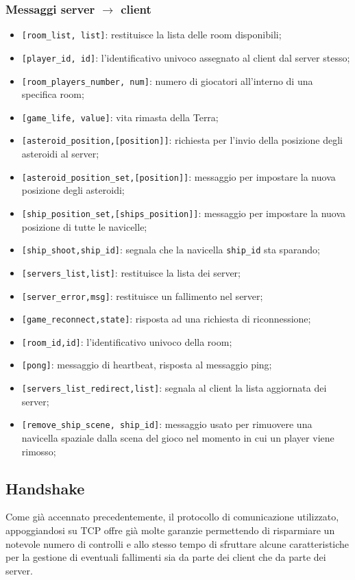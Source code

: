 \documentclass[paper=a4, fontsize=11pt]{scrartcl} %
\numberwithin{equation}{section} %
\numberwithin{figure}{section} %
\numberwithin{table}{section} %
\begin{document}
\subsubsection{Messaggi server $\rightarrow$ client}
\begin{itemize}
\item \texttt{[room\_list, list]}: restituisce la lista delle room disponibili;
\item \texttt{[player\_id, id]}: l'identificativo univoco assegnato al client dal server stesso;
\item \texttt{[room\_players\_number, num]}: numero di giocatori all'interno di una specifica room;
\item \texttt{[game\_life, value]}: vita rimasta della Terra;
\item \texttt{[asteroid\_position,[position]]}: richiesta per l'invio della posizione degli asteroidi al server;
\item \texttt{[asteroid\_position\_set,[position]]}: messaggio per impostare la nuova posizione degli asteroidi;
\item \texttt{[ship\_position\_set,[ships\_position]]}: messaggio per impostare la nuova posizione di tutte le navicelle;
\item \texttt{[ship\_shoot,ship\_id]}: segnala che la navicella \texttt{ship\_id} sta sparando;
\item \texttt{[servers\_list,list]}: restituisce la lista dei server;
\item \texttt{[server\_error,msg]}: restituisce un fallimento nel server;
\item \texttt{[game\_reconnect,state]}: risposta ad una richiesta di riconnessione;
\item \texttt{[room\_id,id]}: l'identificativo univoco della room;
\item \texttt{[pong]}: messaggio di heartbeat, risposta al messaggio ping;
\item \texttt{[servers\_list\_redirect,list]}: segnala al client la lista aggiornata dei server;
\item \texttt{[remove\_ship\_scene, ship\_id]}: messaggio usato per rimuovere una navicella spaziale dalla scena del gioco nel momento in cui un player viene rimosso;
\end{itemize}

\subsection{Handshake}
Come già accennato precedentemente, il protocollo di comunicazione utilizzato, appoggiandosi su TCP offre già molte garanzie permettendo di risparmiare un notevole numero di controlli e allo stesso tempo di sfruttare alcune caratteristiche per la gestione di eventuali fallimenti sia da parte dei client che da parte dei server.
\end{document}
